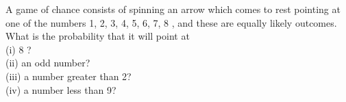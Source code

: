 A game of chance consists of spinning an arrow which comes to rest pointing at one of the numbers 1, 2, 3, 4, 5, 6, 7, 8 , and these are equally likely outcomes. What is the probability that it will point at\\
(i) 8 ?\\
(ii) an odd number?\\
(iii) a number greater than 2?\\
(iv) a number less than 9?\\
